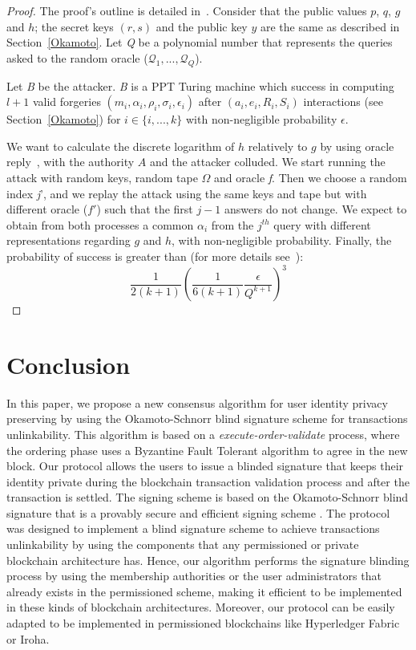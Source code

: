 \documentclass[conference]{llncs}
\begin{document}
\begin{proof}
The proof's outline is detailed in~\cite{pointcheval1996provably}.
Consider that the public values $p$, $q$, $g$ and $h$; the secret keys $(r,s)$ and the public key $y$ are the same as described in Section~\ref{Okamoto}. Let \textit{Q} be a polynomial number that represents the queries asked to the random oracle ($\mathcal{Q}_1,...,\mathcal{Q}_Q$).

Let \textit{B} be the attacker. \textit{B} is a PPT Turing machine which success in computing  $l+1$ valid forgeries $(m_i,\alpha_i,\rho_i,\sigma_i,\epsilon_i)$ after $(a_i,e_i,R_i,S_i)$ interactions (see Section~\ref{Okamoto}) for $i\in\{i,...,k\}$ with non-negligible probability $\epsilon$.

We want to calculate the discrete logarithm of $h$ relatively to $g$ by using oracle reply~\cite{10.1007/3-540-68339-9_33}, with the authority $A$ and the attacker colluded. We start running the attack with random keys, random tape $\Omega$ and oracle \textit{f}. Then we choose a random index \textit{j}', and we replay the attack using the same keys and tape but with different oracle ($f'$) such that the first $j-1$ answers do not change. We expect to obtain from both processes a common $\alpha_i$ from the $j^{th}$ query with different representations regarding $g$ and $h$, with non-negligible probability. Finally, the probability of success is greater than (for more details see~\cite{pointcheval1996provably}):
\begin{equation}
    \frac{1}{2(k+1)}\left(\frac{1}{6(k+1)}\frac{\epsilon}{Q^{k+1}}\right)^3
\end{equation}
\end{proof}

\section{Conclusion} \label{conclu}
In this paper, we propose a new consensus algorithm for user identity privacy preserving by using the Okamoto-Schnorr blind signature scheme for transactions unlinkability. This algorithm is based on a \emph{execute-order-validate} process, where the ordering phase uses a Byzantine Fault Tolerant algorithm to agree in the new block. Our protocol allows the users to issue a blinded signature that keeps their identity private during the blockchain transaction validation process and after the transaction is settled. The signing scheme is based on the Okamoto-Schnorr blind signature that is a provably secure \cite{pointcheval1996provably} and efficient signing scheme \cite{schnorr1991efficient}. The protocol was designed to implement a blind signature scheme to achieve transactions unlinkability by using the components that any permissioned or private blockchain architecture has. Hence, our algorithm performs the signature blinding process by using the membership authorities or the user administrators that already exists in the permissioned scheme, making it efficient to be implemented in these kinds of blockchain architectures. Moreover, our protocol can be easily adapted to be implemented in permissioned blockchains like Hyperledger Fabric or Iroha.
\end{document}
